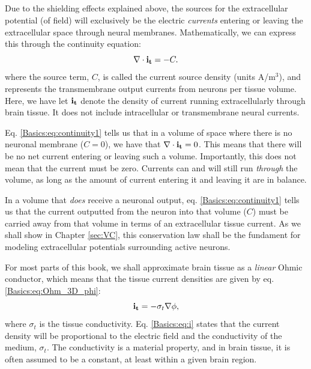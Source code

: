\subsection{}
\label{sec:Basics:C} 
Due to the shielding effects explained above, the sources for the extracellular potential (of field) will exclusively be the electric \textit{currents} entering or leaving the extracellular space through neural membranes. Mathematically, we can express this through the continuity equation:
\begin{equation}
\nabla \cdot {\bf i_t} = -C.
\label{Basics:eq:continuity1}
\end{equation}
where the source term, $C$, is called the current source density (units A/m$^3$), and represents  the transmembrane output currents from neurons per tissue volume. Here, we have let ${\bf i_t}$ denote the density of current running extracellularly through brain tissue. It does not include intracellular or transmembrane neural currents. 

Eq. \ref{Basics:eq:continuity1} tells us that in a volume of space where there is no neuronal membrane ($C = 0$), we have that $\nabla \cdot {\bf i_t} = 0$. This means that there will be no net current entering or leaving such a volume. Importantly, this does not mean that the current must be zero. Currents can and will still run \textit{through} the volume, as long as the amount of current entering it and leaving it are in balance. 

In a volume that \textit{does} receive a neuronal output, eq. \ref{Basics:eq:continuity1} tells us that the current outputted from the neuron into that volume ($C$) must be carried away from that volume in terms of an extracellular tissue current. As we shall show in Chapter \ref{sec:VC}, this conservation law shall be the fundament for modeling extracellular potentials surrounding active neurons.

For most parts of this book, we shall approximate brain tissue as a \textit{linear} Ohmic conductor, which means that the tissue current densities are given by eq. \ref{Basics:eq:Ohm_3D_phi}:
\begin{equation}
{\bf i_t} = - \sigma_t \nabla \phi, 
\label{Basics:eq:i}
\end{equation}
where $\sigma_t$ is the tissue conductivity. Eq. \ref{Basics:eq:i} states that the current density will be proportional to the electric field and the conductivity of the medium, $\sigma_t$. The conductivity is a material property, and in brain tissue, it is often assumed to be a constant, at least within a given brain region. 


